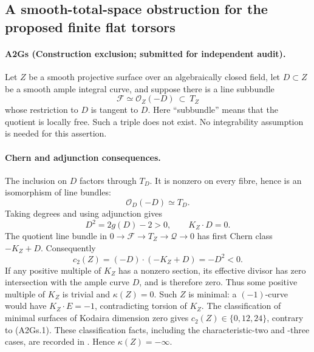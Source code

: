 \subsection{A smooth-total-space obstruction for the proposed finite flat torsors}
\paragraph{A2Gs (Construction exclusion; submitted for independent audit).}
Let $Z$ be a smooth projective surface over an algebraically closed
field, let $D\subset Z$ be a smooth ample integral curve, and suppose
there is a line subbundle
\[
 \mathcal F\simeq\mathcal O_Z(-D)\ \subset\ T_Z
\]
whose restriction to $D$ is tangent to $D$. Here ``subbundle'' means
that the quotient is locally free. Such a triple does not exist.
No integrability assumption is needed for this assertion.

\paragraph{Chern and adjunction consequences.}
The inclusion on $D$ factors through $T_D$. It is nonzero on every
fibre, hence is an isomorphism of line bundles:
\[
 \mathcal O_D(-D)\simeq T_D.
\]
Taking degrees and using adjunction gives
\[
 D^2=2g(D)-2>0,\qquad K_Z\cdot D=0.
\]
The quotient line bundle in $0\to\mathcal F\to T_Z\to\mathcal Q\to0$
has first Chern class $-K_Z+D$. Consequently
\[
 c_2(Z)=(-D)\cdot(-K_Z+D)=-D^2<0.                 \tag{A2Gs.1}
\]
If any positive multiple of $K_Z$ has a nonzero section, its effective
divisor has zero intersection with the ample curve $D$, and is therefore
zero. Thus some positive multiple of $K_Z$ is trivial and
$\kappa(Z)=0$. Such $Z$ is minimal: a $(-1)$-curve would have
$K_Z\cdot E=-1$, contradicting torsion of $K_Z$. The classification
of minimal surfaces of Kodaira dimension zero gives
$c_2(Z)\in\{0,12,24\}$, contrary to (A2Gs.1). These classification
facts, including the characteristic-two and -three cases, are recorded
in \cite[Section 7, pp.~26--30]{DGJ_LiedtkeSurfaces2013}.
Hence $\kappa(Z)=-\infty$.

